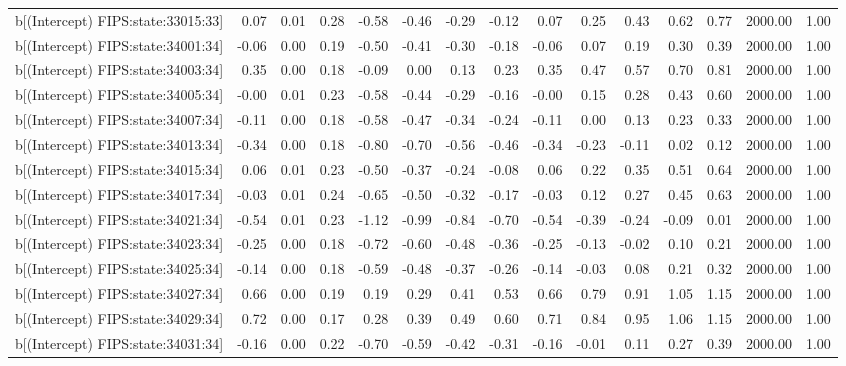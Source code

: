 \begin{table}[ht]
\begin{tabular}{rrrrrrrrrrrrrrr}
  b[(Intercept) FIPS:state:33015:33] & 0.07 & 0.01 & 0.28 & -0.58 & -0.46 & -0.29 & -0.12 & 0.07 & 0.25 & 0.43 & 0.62 & 0.77 & 2000.00 & 1.00 \\ 
  b[(Intercept) FIPS:state:34001:34] & -0.06 & 0.00 & 0.19 & -0.50 & -0.41 & -0.30 & -0.18 & -0.06 & 0.07 & 0.19 & 0.30 & 0.39 & 2000.00 & 1.00 \\ 
  b[(Intercept) FIPS:state:34003:34] & 0.35 & 0.00 & 0.18 & -0.09 & 0.00 & 0.13 & 0.23 & 0.35 & 0.47 & 0.57 & 0.70 & 0.81 & 2000.00 & 1.00 \\ 
  b[(Intercept) FIPS:state:34005:34] & -0.00 & 0.01 & 0.23 & -0.58 & -0.44 & -0.29 & -0.16 & -0.00 & 0.15 & 0.28 & 0.43 & 0.60 & 2000.00 & 1.00 \\ 
  b[(Intercept) FIPS:state:34007:34] & -0.11 & 0.00 & 0.18 & -0.58 & -0.47 & -0.34 & -0.24 & -0.11 & 0.00 & 0.13 & 0.23 & 0.33 & 2000.00 & 1.00 \\ 
  b[(Intercept) FIPS:state:34013:34] & -0.34 & 0.00 & 0.18 & -0.80 & -0.70 & -0.56 & -0.46 & -0.34 & -0.23 & -0.11 & 0.02 & 0.12 & 2000.00 & 1.00 \\ 
  b[(Intercept) FIPS:state:34015:34] & 0.06 & 0.01 & 0.23 & -0.50 & -0.37 & -0.24 & -0.08 & 0.06 & 0.22 & 0.35 & 0.51 & 0.64 & 2000.00 & 1.00 \\ 
  b[(Intercept) FIPS:state:34017:34] & -0.03 & 0.01 & 0.24 & -0.65 & -0.50 & -0.32 & -0.17 & -0.03 & 0.12 & 0.27 & 0.45 & 0.63 & 2000.00 & 1.00 \\ 
  b[(Intercept) FIPS:state:34021:34] & -0.54 & 0.01 & 0.23 & -1.12 & -0.99 & -0.84 & -0.70 & -0.54 & -0.39 & -0.24 & -0.09 & 0.01 & 2000.00 & 1.00 \\ 
  b[(Intercept) FIPS:state:34023:34] & -0.25 & 0.00 & 0.18 & -0.72 & -0.60 & -0.48 & -0.36 & -0.25 & -0.13 & -0.02 & 0.10 & 0.21 & 2000.00 & 1.00 \\ 
  b[(Intercept) FIPS:state:34025:34] & -0.14 & 0.00 & 0.18 & -0.59 & -0.48 & -0.37 & -0.26 & -0.14 & -0.03 & 0.08 & 0.21 & 0.32 & 2000.00 & 1.00 \\ 
  b[(Intercept) FIPS:state:34027:34] & 0.66 & 0.00 & 0.19 & 0.19 & 0.29 & 0.41 & 0.53 & 0.66 & 0.79 & 0.91 & 1.05 & 1.15 & 2000.00 & 1.00 \\ 
  b[(Intercept) FIPS:state:34029:34] & 0.72 & 0.00 & 0.17 & 0.28 & 0.39 & 0.49 & 0.60 & 0.71 & 0.84 & 0.95 & 1.06 & 1.15 & 2000.00 & 1.00 \\ 
  b[(Intercept) FIPS:state:34031:34] & -0.16 & 0.00 & 0.22 & -0.70 & -0.59 & -0.42 & -0.31 & -0.16 & -0.01 & 0.11 & 0.27 & 0.39 & 2000.00 & 1.00 \\ 

\end{tabular}
\end{table}
